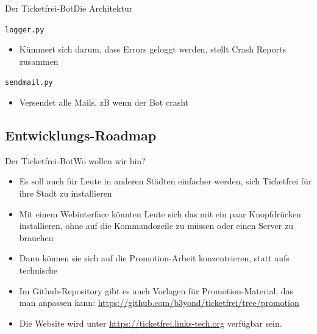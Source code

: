 \documentclass[10pt]{beamer}
\begin{document}
{\begin{frame}{Der Ticketfrei-Bot}{Die Architektur}
\begin{block}{{\tt logger.py}}
  \begin{itemize}
    \item Kümmert sich darum, dass Errors geloggt werden, stellt Crash Reports zusammen
  \end{itemize}
\end{block}

\begin{block}{{\tt sendmail.py}}
  \begin{itemize}
    \item Versendet alle Mails, zB wenn der Bot crasht
  \end{itemize}
\end{block}

\end{frame}

\subsection{Entwicklungs-Roadmap}
\begin{frame}{Der Ticketfrei-Bot}{Wo wollen wir hin?}

\begin{itemize}
  \item<1-> Es soll auch für Leute in anderen Städten einfacher werden, sich Ticketfrei für ihre Stadt zu installieren
  \item<1-> Mit einem Webinterface könnten Leute sich das mit ein paar Knopfdrücken installieren, ohne auf die Kommandozeile zu müssen oder einen Server zu brauchen
  \item<2-> Dann können sie sich auf die Promotion-Arbeit konzentrieren, statt aufs technische
  \item<2-> Im Github-Repository gibt es auch Vorlagen für Promotion-Material, das man anpassen kann: \url{https://github.com/b3yond/ticketfrei/tree/promotion}
  \item<2-> Die Website wird unter \url{https://ticketfrei.links-tech.org} verfügbar sein.
\end{itemize}


\end{frame}

}
\end{document}
